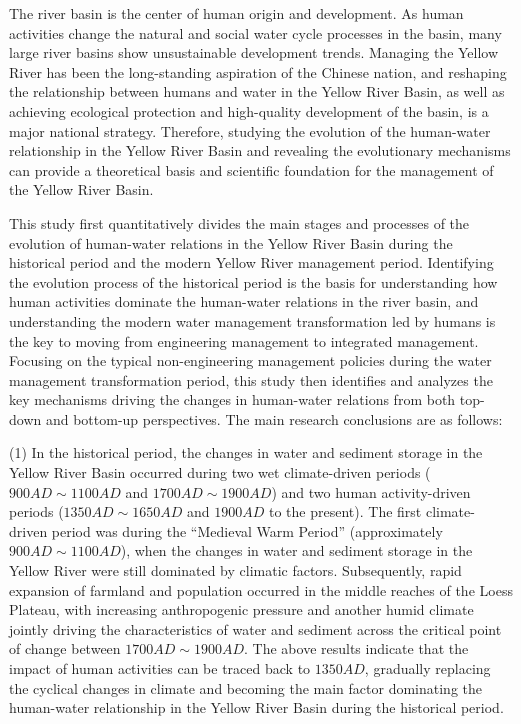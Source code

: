 \begin{eabstract}
  The river basin is the center of human origin and development. As human activities change the natural and social water cycle processes in the basin, many large river basins show unsustainable development trends. Managing the Yellow River has been the long-standing aspiration of the Chinese nation, and reshaping the relationship between humans and water in the Yellow River Basin, as well as achieving ecological protection and high-quality development of the basin, is a major national strategy. Therefore, studying the evolution of the human-water relationship in the Yellow River Basin and revealing the evolutionary mechanisms can provide a theoretical basis and scientific foundation for the management of the Yellow River Basin.

  This study first quantitatively divides the main stages and processes of the evolution of human-water relations in the Yellow River Basin during the historical period and the modern Yellow River management period. Identifying the evolution process of the historical period is the basis for understanding how human activities dominate the human-water relations in the river basin, and understanding the modern water management transformation led by humans is the key to moving from engineering management to integrated management.
  Focusing on the typical non-engineering management policies during the water management transformation period, this study then identifies and analyzes the key mechanisms driving the changes in human-water relations from both top-down and bottom-up perspectives. The main research conclusions are as follows:

  (1) In the historical period, the changes in water and sediment storage in the Yellow River Basin occurred during two wet climate-driven periods ($900AD\sim1100AD$ and $1700AD\sim1900AD$) and two human activity-driven periods ($1350AD \sim 1650AD$ and $1900AD$ to the present). The first climate-driven period was during the ``Medieval Warm Period'' (approximately $900AD \sim 1100AD$), when the changes in water and sediment storage in the Yellow River were still dominated by climatic factors. Subsequently, rapid expansion of farmland and population occurred in the middle reaches of the Loess Plateau, with increasing anthropogenic pressure and another humid climate jointly driving the characteristics of water and sediment across the critical point of change between $1700AD \sim 1900AD$. The above results indicate that the impact of human activities can be traced back to $1350AD$, gradually replacing the cyclical changes in climate and becoming the main factor dominating the human-water relationship in the Yellow River Basin during the historical period.


\end{eabstract}
